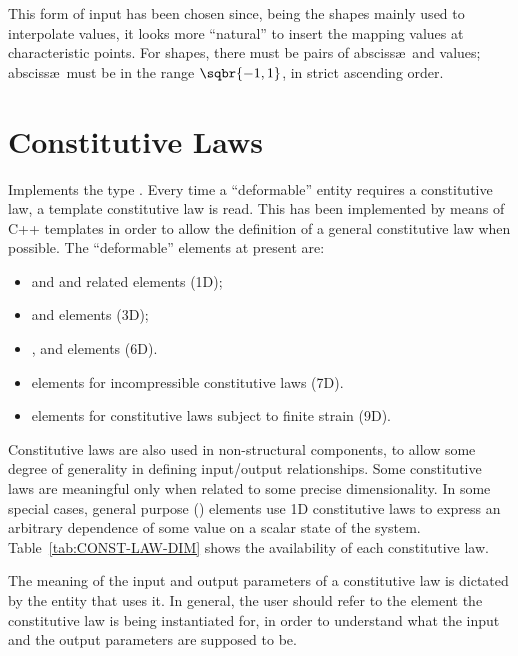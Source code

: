 This form of input has been chosen since, being the shapes mainly used to
interpolate values, it looks more ``natural'' to insert the mapping values
at characteristic points.
For  shapes, there must be 
 pairs of absciss\ae\ and values; absciss\ae\
must be in the range $\sqbr{-1,1}$, in strict ascending order.


\section{Constitutive Laws}\label{sec:ConstitutiveLaw}
Implements the type \texttt{}.
Every time a ``deformable'' entity requires a constitutive law, a template
constitutive law is read. This has been implemented by means of C++
templates in order to allow the definition of a general constitutive law
when possible.
The ``deformable'' elements at present are:
\begin{itemize}
\item {}
	and
	and related elements (1D);
\item {}
	and 
	elements (3D);
\item {},  and 
        elements (6D).
\item {}
  elements for incompressible constitutive laws (7D).
\item \htmlref{\kw{solid}}{sec:EL:SOLID}
	elements for constitutive laws subject to finite strain (9D).
\end{itemize}

Constitutive laws are also used in non-structural components,
to allow some degree of generality in defining input/output relationships.
Some constitutive laws are meaningful only when related to some precise
dimensionality. 
In some special cases, general purpose ()
elements use 1D constitutive laws to express an arbitrary dependence
of some value on a scalar state of the system.
Table~\ref{tab:CONST-LAW-DIM} shows the availability of each constitutive law.

The meaning of the input and output parameters of a constitutive law
is dictated by the entity that uses it.
In general, the user should refer to the element the constitutive law
is being instantiated for, in order to understand what the input
and the output parameters are supposed to be.

